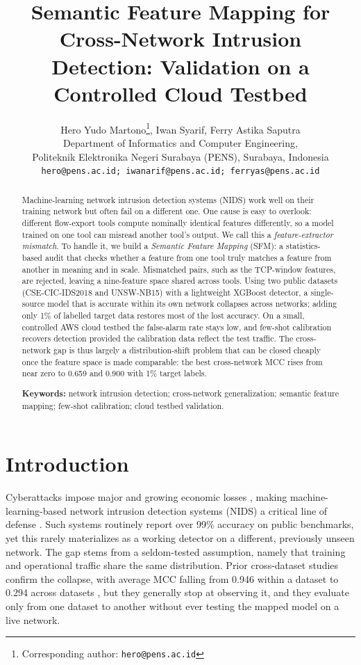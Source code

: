 \documentclass[11pt,a4paper]{article}
\title{\textbf{Semantic Feature Mapping for Cross-Network Intrusion Detection:
Validation on a Controlled Cloud Testbed}}
\author{Hero Yudo Martono\thanks{Corresponding author: \texttt{hero@pens.ac.id}},
\quad Iwan Syarif, \quad Ferry Astika Saputra \\[0.3em]
\normalsize Department of Informatics and Computer Engineering, \\
\normalsize Politeknik Elektronika Negeri Surabaya (PENS), Surabaya, Indonesia \\
\normalsize \texttt{hero@pens.ac.id; iwanarif@pens.ac.id; ferryas@pens.ac.id}}
\date{}
\begin{document}
\maketitle

\begin{abstract}
\noindent Machine-learning network intrusion detection systems (NIDS) work well on their
training network but often fail on a different one. One cause is easy to overlook:
different flow-export tools compute nominally identical features differently, so a model
trained on one tool can misread another tool's output. We call this a
\emph{feature-extractor mismatch}. To handle it, we build a \emph{Semantic Feature
Mapping} (SFM): a statistics-based audit that checks whether a feature from one tool
truly matches a feature from another in meaning and in scale. Mismatched pairs, such as
the TCP-window features, are rejected, leaving a nine-feature space shared across tools.
Using two public datasets (CSE-CIC-IDS2018 and UNSW-NB15) with a lightweight XGBoost
detector, a single-source model that is accurate within its own network collapses across
networks; adding only 1\% of labelled target data restores most of the lost accuracy. On
a small, controlled AWS cloud testbed the false-alarm rate stays low, and few-shot
calibration recovers detection provided the calibration data reflect the test traffic.
The cross-network gap is thus largely a distribution-shift problem that can be closed
cheaply once the feature space is made comparable: the best cross-network MCC rises from
near zero to 0.659 and 0.900 with 1\% target labels.

\medskip
\noindent\textbf{Keywords:} network intrusion detection; cross-network
generalization; semantic feature mapping; few-shot calibration; cloud testbed
validation.
\end{abstract}

\section{Introduction}
Cyberattacks impose major and growing economic losses \cite{cremer}, making
machine-learning-based network intrusion detection systems (NIDS) a critical line of
defense \cite{khraisat,buczak}. Such systems routinely report over 99\% accuracy on
public benchmarks, yet this rarely materializes as a working detector on a different,
previously unseen network. The gap stems from a seldom-tested assumption, namely that
training and operational traffic share the same distribution. Prior cross-dataset
studies \cite{cantone,dhooge,verkerken} confirm the collapse, with average MCC falling
from 0.946 within a dataset to 0.294 across datasets \cite{cantone}, but they generally
stop at observing it, and they evaluate only from one dataset to another without ever
testing the mapped model on a live network.
\end{document}
